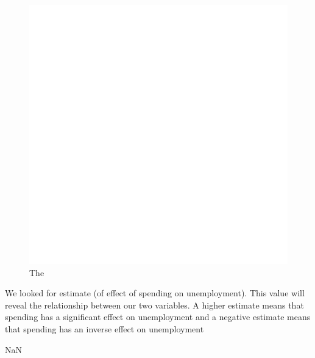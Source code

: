 \documentclass{article}
\begin{document}
\graphicspath{ {../../images/} }
\begin{figure}
\centering
\includegraphics[scale=.5]{unemployment}
\caption{The}
\end{figure}


We looked for estimate (of effect of spending on unemployment). This value will reveal the relationship between our two variables.  A higher estimate means that spending has a significant effect on unemployment and a negative estimate means that spending has an inverse effect on unemployment

\begin{Schunk}
\begin{Soutput}
[1] NaN
\end{Soutput}
\end{Schunk}
\end{document}
